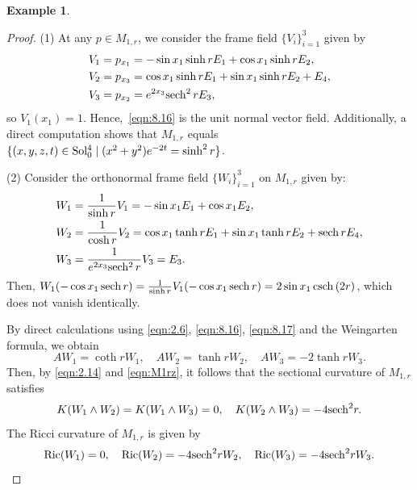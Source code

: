 \documentclass[reqno]{amsart}%
\theoremstyle{definition}
\newtheorem{example}{Example}[section]  %
\numberwithin{equation}{section}
\begin{document}
\begin{example}
		\begin{proof}
			(1) At any $p\in M_{1,r}$, we consider the frame field
			$\{V_i\}_{i=1}^3$ given by
			\begin{equation*}
				\begin{aligned}
					&V_1=p_{x_1}=-\sin {x_1}\sinh r E_1+\cos {x_1}\sinh r E_2,\\
					&V_2=p_{x_3}=\cos {x_1}\sinh r E_1+\sin {x_1}\sinh r E_2+E_4,\\
					&V_3=p_{x_2}=e^{2 x_3}{\rm sech^2}\, r E_3,
				\end{aligned}
			\end{equation*}
			so $V_1(x_1)=1$.
			Hence,~\eqref{eqn:8.16} is the unit normal vector field.
			Additionally, a direct computation shows that $M_{1,r}$ equals $\{(x,y,z,t)\in {\rm Sol_0^4}
			\mid  (x^2+y^2)e^{-2t}=\sinh^2 r\}$.
			
			(2) Consider the orthonormal frame field $\{ W_i \}_{i=1}^3$ on $M_{1,r}$ given by:
			\begin{equation}\label{eqn:8.17}
				\begin{aligned}
					&W_1=\frac{1}{\sinh r}V_1=-\sin x_1E_1+\cos x_1E_2,\\
					&W_2=\frac{1}{\cosh r}V_2=\cos x_1\tanh r E_1+\sin x_1\tanh r E_2+{\rm sech}\, rE_4,\\
					&W_3=\frac{1}{e^{2x_3}{\rm sech^2}\, r}V_3=E_3.
				\end{aligned}
			\end{equation}
			Then, $W_1(-\cos x_1\, {\rm sech}\, r)=\tfrac{1}{\sinh r}V_1(-\cos x_1\, {\rm sech}\, r)
			=2\sin x_1\, {\rm csch}\, (2r)$, which does not vanish identically.
			
			By direct calculations using \eqref{eqn:2.6}, \eqref{eqn:8.16},
			\eqref{eqn:8.17} and the Weingarten formula, we obtain
			\begin{equation}\label{eqn:M1rz}
				AW_1=\coth r W_1, \quad AW_2=\tanh r W_2, \quad AW_3=-2\tanh r W_3.
			\end{equation}
			Then, by \eqref{eqn:2.14} and \eqref{eqn:M1rz}, it follows that the sectional curvature of $M_{1,r}$ satisfies
			\begin{equation}\label{eqn:M1rsec}
				K(W_1\wedge W_2)=K(W_1\wedge W_3)=0, \quad K(W_2\wedge W_3)=-4 {\rm sech}^2 r.
			\end{equation}
			The Ricci curvature of $M_{1,r}$ is given by 
			\begin{equation}\label{eqn:M1rric}
				{\rm Ric}(W_1)=0, \quad {\rm Ric}(W_2)=-4 {\rm sech}^2 r W_2,\quad {\rm Ric}(W_3)=-4 {\rm sech}^2 r W_3. 
			\end{equation}
			

\end{proof}
\end{example}
\end{document}
